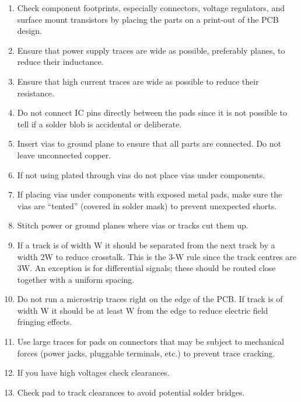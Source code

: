 \begin{enumerate}
\item Check component footprints, especially connectors, voltage
  regulators, and surface mount transistors by placing the parts on a
  print-out of the PCB design.

\item Ensure that power supply traces are wide as possible, preferably
  planes, to reduce their inductance.

\item Ensure that high current traces are wide as possible to reduce their resistance.

\item Do not connect IC pins directly between the pads since it is not
  possible to tell if a solder blob is accidental or deliberate.

\item Insert vias to ground plane to ensure that all parts are
  connected.  Do not leave unconnected copper.

\item If not using plated through vias do not place vias under
  components.

\item If placing vias under components with exposed metal pads, make
  sure the vias are ``tented'' (covered in solder mask) to prevent
  unexpected shorts.

\item Stitch power or ground planes where vias or tracks cut them up.

\item If a track is of width W it should be separated from the next
  track by a width 2W to reduce crosstalk.  This is the 3-W rule since
  the track centres are 3W.  An exception is for differential signals;
  these should be routed close together with a uniform spacing.

\item Do not run a microstrip traces right on the edge of the PCB.  If
  track is of width W it should be at least W from the edge to reduce
  electric field fringing effects.

\item Use large traces for pads on connectors that may be subject to
  mechanical forces (power jacks, pluggable terminals, etc.) to
  prevent trace cracking.

\item If you have high voltages check clearances.

\item Check pad to track clearances to avoid potential solder bridges.


\end{enumerate}
